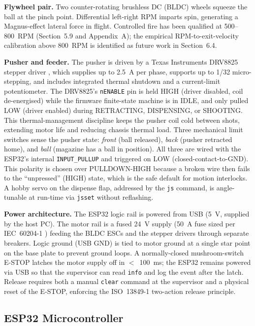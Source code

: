 \textbf{Flywheel pair.} Two counter-rotating brushless DC (BLDC) wheels squeeze the ball at the pinch point. Differential left-right RPM imparts spin, generating a Magnus-effect lateral force in flight. Controlled fire has been qualified at 500--800~RPM (Section~5.9 and Appendix~A); the empirical RPM-to-exit-velocity calibration above 800~RPM is identified as future work in Section~6.4.

\textbf{Pusher and feeder.} The pusher is driven by a Texas Instruments DRV8825 stepper driver \cite{ref42_drv8825}, which supplies up to 2.5~A per phase, supports up to 1/32 micro-stepping, and includes integrated thermal shutdown and a current-limit potentiometer. The DRV8825's \texttt{nENABLE} pin is held HIGH (driver disabled, coil de-energised) while the firmware finite-state machine is in IDLE, and only pulled LOW (driver enabled) during RETRACTING, DISPENSING, or SHOOTING. This thermal-management discipline keeps the pusher coil cold between shots, extending motor life and reducing chassis thermal load. Three mechanical limit switches sense the pusher state: \textit{front} (ball released), \textit{back} (pusher retracted home), and \textit{ball} (magazine has a ball in position). All three are wired with the ESP32's internal \texttt{INPUT\_PULLUP} and triggered on LOW (closed-contact-to-GND). This polarity is chosen over PULLDOWN-HIGH because a broken wire then fails to the ``unpressed'' (HIGH) state, which is the safe default for motion interlocks. A hobby servo on the dispense flap, addressed by the \texttt{js} command, is angle-tunable at run-time via \texttt{jsset} without reflashing.

\textbf{Power architecture.} The ESP32 logic rail is powered from USB (5~V, supplied by the host PC). The motor rail is a fused 24~V supply (50~A fuse sized per IEC~60204-1 \cite{ref45_iec60204}) feeding the BLDC ESCs and the stepper drivers through separate breakers. Logic ground (USB GND) is tied to motor ground at a single star point on the base plate to prevent ground loops. A normally-closed mushroom-switch E-STOP latches the motor supply off in $<$~100~ms; the ESP32 remains powered via USB so that the supervisor can read \texttt{info} and log the event after the latch. Release requires both a manual \texttt{clear} command at the supervisor and a physical reset of the E-STOP, enforcing the ISO~13849-1 \cite{ref44_iso13849} two-action release principle.

\subsection{ESP32 Microcontroller}


